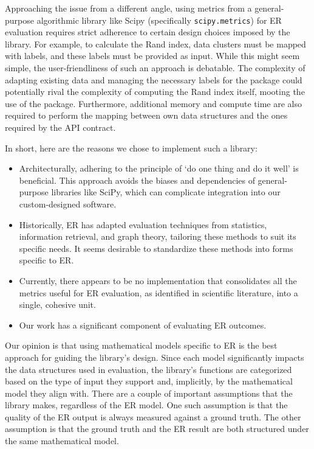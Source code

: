 \documentclass[a4paper,twoside]{article}
\begin{document}
    Approaching the issue from a different angle, using metrics from a
    general-purpose algorithmic library like Scipy (specifically
    \texttt{scipy.metrics}) for ER evaluation requires strict
    adherence to certain design choices imposed by the library.
    For example, to calculate the Rand index, data clusters must be mapped with
    labels, and these labels must be provided as input.
    While this might seem simple, the user-friendliness of such an approach is
    debatable.
    The complexity of adapting existing data and managing the necessary labels
    for the package could potentially rival the complexity of computing the Rand
    index itself, mooting the use of the package.
    Furthermore, additional memory and compute time are also required to perform
    the mapping between own data structures and the ones required by the API
    contract.

    In short, here are the reasons we chose to implement such a library:
    \begin{itemize}
    \item Architecturally, adhering to the principle of `do one thing and do
    it well' is beneficial.
    This approach avoids the biases and dependencies of general-purpose
    libraries like SciPy, which can complicate integration into our
    custom-designed software.
    \item Historically, ER has adapted evaluation techniques from
    statistics, information retrieval, and graph theory, tailoring these methods
    to suit its specific needs.
    It seems desirable to standardize these methods into forms specific to
    ER.
    \item Currently, there appears to be no implementation that consolidates all
    the metrics useful for ER evaluation, as identified in
    scientific literature, into a single, cohesive unit.
    \item Our work has a significant component of evaluating ER
    outcomes.
    \end{itemize}

    Our opinion is that using mathematical models specific to ER
    is the best approach for guiding the library's design.
    Since each model significantly impacts the data structures used in
    evaluation, the library's functions are categorized based on the type of
    input they support and, implicitly, by the mathematical model they align
    with. 
    There are a couple of important assumptions that the library makes,
    regardless of the ER model.
    One such assumption is that the quality of the ER output is
    always measured against a ground truth\cite{manning2008}.
    The other assumption is that the ground truth and the ER
    result are both structured under the same mathematical model.
\end{document}
